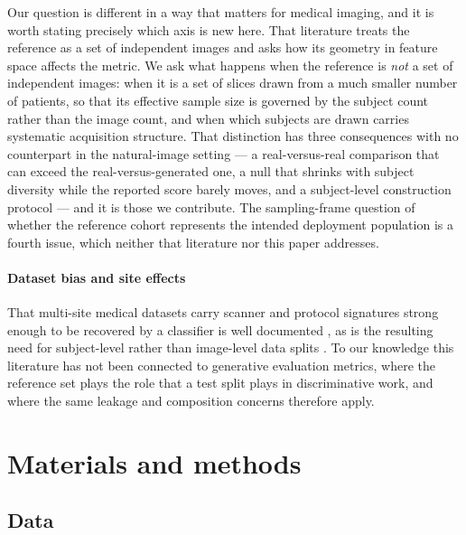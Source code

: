 \documentclass[preprint,12pt,authoryear]{elsarticle}
\begin{document}
Our question is different in a way that matters for medical imaging, and it is
worth stating precisely which axis is new here. That literature treats the
reference as a set of independent images and asks how its geometry in feature
space affects the metric. We ask what happens when the reference is \emph{not}
a set of independent images: when it is a set of slices drawn from a much
smaller number of patients, so that its effective sample size is governed by the
subject count rather than the image count, and when which subjects are drawn
carries systematic acquisition structure. That distinction has three
consequences with no counterpart in the natural-image setting --- a real-versus-real
comparison that can exceed the real-versus-generated one, a null that shrinks
with subject diversity while the reported score barely moves, and a
subject-level construction protocol --- and it is those we contribute. The
sampling-frame question of whether the reference cohort represents the intended
deployment population is a fourth issue, which neither that literature nor this
paper addresses.

\paragraph{Dataset bias and site effects}
That multi-site medical datasets carry scanner and protocol signatures strong
enough to be recovered by a classifier is well documented
\citep{glocker2019machine, wachinger2021detect}, as is the resulting need for
subject-level rather than image-level data splits
\citep{varoquaux2022machine}. To our knowledge this literature has not been
connected to generative evaluation metrics, where the reference set plays the
role that a test split plays in discriminative work, and where the same
leakage and composition concerns therefore apply.

\section{Materials and methods}
\label{sec:methods}

\subsection{Data}
\label{sec:data}
\end{document}
